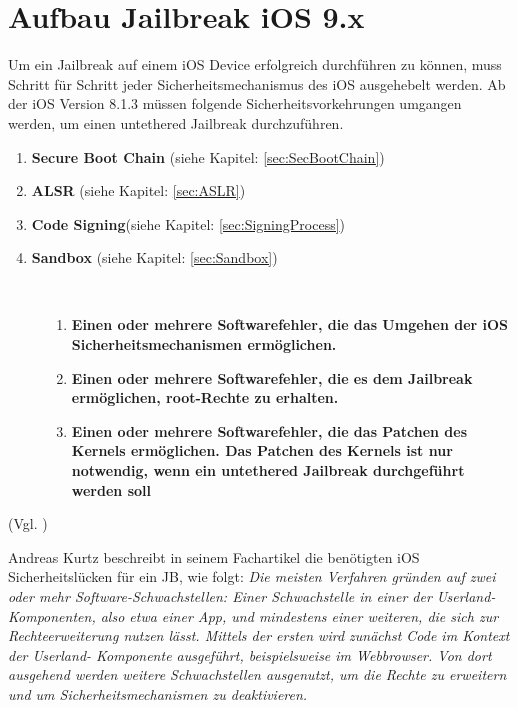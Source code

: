 \section{Aufbau Jailbreak iOS 9.x}
\label{sec:JBAufbau}
Um ein Jailbreak auf einem iOS Device erfolgreich durchführen zu können, muss Schritt für Schritt jeder Sicherheitsmechanismus des iOS ausgehebelt werden. Ab der iOS Version 8.1.3 müssen folgende Sicherheitsvorkehrungen umgangen werden, um einen untethered Jailbreak durchzuführen.

\begin{enumerate}
	    \item \textbf{Secure Boot Chain} (siehe Kapitel: \ref{sec:SecBootChain})
	    \item \textbf{ALSR }(siehe Kapitel: \ref{sec:ASLR}) 
	    \item \textbf{Code Signing}(siehe Kapitel: \ref{sec:SigningProcess}) 	   
	    \item \textbf{Sandbox} (siehe Kapitel: \ref{sec:Sandbox}) 
\end{enumerate}

\begin{description}
    \item[\parbox{\textwidth} {Damit die Sicherheitsmechanismen überhaupt umgangen werden können, müssen verschiedene Programmierfehler im iOS gefunden werden. }]~\par
  \begin{enumerate}
  \item \textbf{Einen oder mehrere Softwarefehler, die das Umgehen der iOS Sicherheitsmechanismen ermöglichen.}
  \item \textbf{Einen oder mehrere Softwarefehler, die es dem Jailbreak ermöglichen, root-Rechte zu erhalten.}
  \item \textbf{Einen oder mehrere Softwarefehler, die das Patchen des Kernels ermöglichen. Das Patchen des Kernels ist nur notwendig, wenn ein untethered Jailbreak durchgeführt werden soll}
\end{enumerate}\end{description} 
(Vgl. \cite{TaiG[1], TaiG[2], TaiG[3]})

Andreas Kurtz beschreibt in seinem Fachartikel die benötigten iOS Sicherheitslücken für ein JB, wie folgt: \textit{\glqq Die meisten Verfahren gründen auf zwei oder mehr Software-Schwachstellen: Einer Schwachstelle in einer der Userland-Komponenten, also etwa einer App, und mindestens einer weiteren, die sich zur Rechteerweiterung nutzen lässt. Mittels der ersten wird zunächst Code im Kontext der Userland- Komponente ausgeführt, beispielsweise im Webbrowser. Von dort ausgehend werden weitere Schwachstellen ausgenutzt, um die Rechte zu erweitern und um Sicherheitsmechanismen zu deaktivieren.\grqq{}} \cite{JB[2]}

